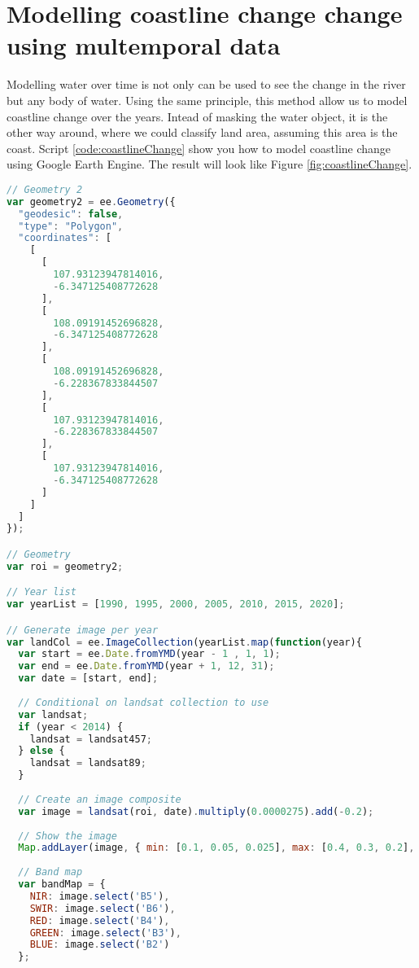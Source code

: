 \section{Modelling coastline change change using multemporal data}
Modelling water over time is not only can be used to see the change in the river but any body of water. Using the same principle, this method allow us to model coastline change over the years. Intead of masking the water object, it is the other way around, where we could classify land area, assuming this area is the coast. Script \ref{code:coastlineChange} show you how to model coastline change using Google Earth Engine. The result will look like Figure \ref{fig:coastlineChange}.

\begin{lstlisting}[language=JavaScript, label={code:coastlineChange}, caption={GEE script to model coastline change}]
// Geometry 2
var geometry2 = ee.Geometry({
  "geodesic": false,
  "type": "Polygon",
  "coordinates": [
    [
      [
        107.93123947814016,
        -6.347125408772628
      ],
      [
        108.09191452696828,
        -6.347125408772628
      ],
      [
        108.09191452696828,
        -6.228367833844507
      ],
      [
        107.93123947814016,
        -6.228367833844507
      ],
      [
        107.93123947814016,
        -6.347125408772628
      ]
    ]
  ]
});

// Geometry
var roi = geometry2;

// Year list
var yearList = [1990, 1995, 2000, 2005, 2010, 2015, 2020];

// Generate image per year
var landCol = ee.ImageCollection(yearList.map(function(year){
  var start = ee.Date.fromYMD(year - 1 , 1, 1);
  var end = ee.Date.fromYMD(year + 1, 12, 31);
  var date = [start, end];
  
  // Conditional on landsat collection to use
  var landsat;
  if (year < 2014) {
    landsat = landsat457;
  } else {
    landsat = landsat89;
  }
  
  // Create an image composite
  var image = landsat(roi, date).multiply(0.0000275).add(-0.2);
  
  // Show the image
  Map.addLayer(image, { min: [0.1, 0.05, 0.025], max: [0.4, 0.3, 0.2], bands: ['B5', 'B6', 'B7'] }, 'Landsat_' + year, false);
  
  // Band map
  var bandMap = { 
    NIR: image.select('B5'), 
    SWIR: image.select('B6'), 
    RED: image.select('B4'), 
    GREEN: image.select('B3'), 
    BLUE: image.select('B2') 
  };
  

\end{lstlisting}
